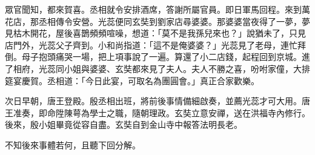眾官聞知，都來賀喜。丞相就令安排酒席，答謝所屬官員。即日軍馬回程。來到萬花店，那丞相傳令安營。光蕊便同玄奘到劉家店尋婆婆。那婆婆當夜得了一夢，夢見枯木開花，屋後喜鵲頻頻喧噪，想道：「莫不是我孫兒來也？」說猶未了，只見店門外，光蕊父子齊到。小和尚指道：「這不是俺婆婆？」光蕊見了老母，連忙拜倒。母子抱頭痛哭一場，把上項事說了一遍。算還了小二店錢，起程回到京城。進了相府，光蕊同小姐與婆婆、玄奘都來見了夫人。夫人不勝之喜，吩咐家僮，大排筵宴慶賀。丞相道：「今日此宴，可取名為團圓會。」真正合家歡樂。

次日早朝，唐王登殿。殷丞相出班，將前後事情備細啟奏，並薦光蕊才可大用。唐王准奏，即命陞陳萼為學士之職，隨朝理政。玄奘立意安禪，送在洪福寺內修行。後來，殷小姐畢竟從容自盡。玄奘自到金山寺中報答法明長老。

不知後來事體若何，且聽下回分解。
